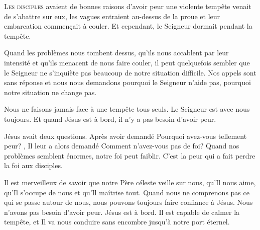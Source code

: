 \dvrule







\lettrine{L}{es disciples} avaient de bonnes raisons d'avoir peur\frcolon{}
 une violente tempête venait de s'abattre sur eux,
 les vagues entraient au-dessus de la proue et leur embarcation
 commen\c{c}ait à couler. Et cependant, le Seigneur dormait pendant la tempête.

Quand les problèmes nous tombent dessus, qu'ils nous accablent
 par leur intensité et qu'ils menacent de nous faire couler,
 il peut quelquefois sembler que le Seigneur ne s'inquiète pas beaucoup
 de notre situation difficile. Nos appels sont sans réponse
 et nous nous demandons pourquoi le Seigneur n'aide pas,
 pourquoi notre situation ne change pas.

Nous ne faisons jamais face à une tempête tous seuls.
 Le Seigneur est avec nous \ocadr toujours.
 Et quand Jésus est à bord, il n'y a pas besoin d'avoir peur.

Jésus avait deux questions. Après avoir demandé\frcolon{} 
 \Og Pourquoi avez-vous tellement peur? \Fg{}, Il leur a alors demandé\frcolon{} 
 \Og Comment n'avez-vous pas de foi? \Fg{}
 Quand nos problèmes semblent énormes, notre foi peut faiblir.
 C'est la peur qui a fait perdre la foi aux disciples.


Il est merveilleux de savoir que notre Père céleste veille sur nous,
 qu'Il nous aime, qu'Il s'occupe de nous et qu'Il maîtrise tout.
 Quand nous ne comprenons pas ce qui se passe autour de nous,
 nous pouvons toujours faire confiance à Jésus.
 Nous n'avons pas besoin d'avoir peur. Jésus est à bord.
 Il  est capable de calmer la tempête,
 et Il va nous conduire sans encombre jusqu'à notre port éternel.

